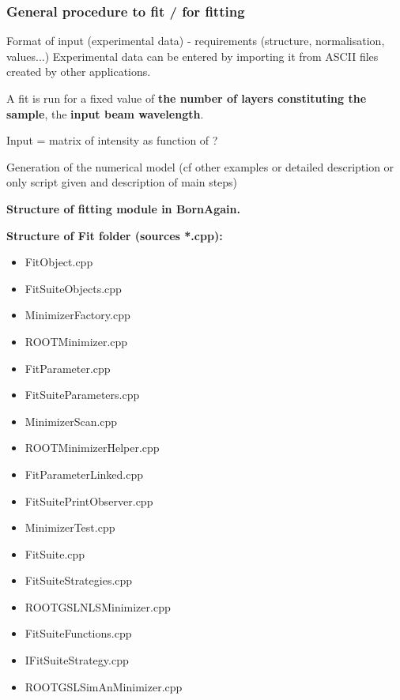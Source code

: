 
\subsubsection{General procedure to fit / for fitting}

Format of input (experimental data) - requirements (structure,
normalisation, values...)
Experimental data can be entered by importing it from ASCII files created by other applications.

A fit is run for a fixed value of \textbf{the number of layers
  constituting the sample}, the \textbf{input beam wavelength}.

Input = matrix of intensity as function of ?

Generation of the numerical model (cf other examples or detailed
description or only script given and description of main steps)

\textbf{Structure of fitting module in BornAgain.}


\textbf{Structure of Fit folder (sources *.cpp):}
\begin{itemize}
\item FitObject.cpp
\item FitSuiteObjects.cpp		
\item MinimizerFactory.cpp
\item ROOTMinimizer.cpp
\item FitParameter.cpp		
\item FitSuiteParameters.cpp		
\item MinimizerScan.cpp		
\item ROOTMinimizerHelper.cpp
\item FitParameterLinked.cpp		
\item FitSuitePrintObserver.cpp	
\item MinimizerTest.cpp
\item FitSuite.cpp			
\item FitSuiteStrategies.cpp		
\item ROOTGSLNLSMinimizer.cpp
\item FitSuiteFunctions.cpp		
\item IFitSuiteStrategy.cpp
\item ROOTGSLSimAnMinimizer.cpp
\end{itemize}

